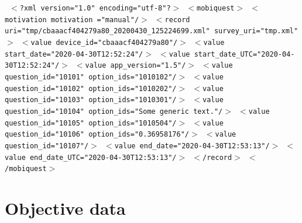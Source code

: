 \documentclass[11pt,a4paper,titlepage]{article}
\begin{document}
\begin{center}
	\begin{tcolorbox}[colback=black!10!white,colframe=black!50!white, boxsep=1pt,left=4pt,right=4pt,top=4pt,bottom=2pt]
		\texttt{\noindent
			$<$?xml version="1.0" encoding="utf-8"?$>$\newline
			$<$mobiquest$>$\newline
			$<$motivation motivation ="manual"/$>$\newline
			$<$record uri="tmp/cbaaacf404279a80\_20200430\_125224699.xml"\newline
			\hspace*{0.5cm}survey\_uri="tmp.xml"$>$\newline
			$<$value device\_id="cbaaacf404279a80"/$>$\newline
			$<$value start\_date="2020-04-30T12:52:24"/$>$\newline
			$<$value start\_date\_UTC="2020-04-30T12:52:24"/$>$\newline
			$<$value app\_version="1.5"/$>$\newline
			$<$value question\_id="10101" option\_ids="1010102"/$>$\newline
			$<$value question\_id="10102" option\_ids="1010202"/$>$\newline
			$<$value question\_id="10103" option\_ids="1010301"/$>$\newline
			$<$value question\_id="10104" option\_ids="Some generic text."/$>$\newline
			$<$value question\_id="10105" option\_ids="1010504"/$>$\newline
			$<$value question\_id="10106" option\_ids="0.36958176"/$>$\newline
			$<$value question\_id="10107"/$>$\newline
			$<$value end\_date="2020-04-30T12:53:13"/$>$\newline
			$<$value end\_date\_UTC="2020-04-30T12:53:13"/$>$\newline
			$<$/record$>$\newline
			$<$/mobiquest$>$
		}
	\end{tcolorbox}
\end{center}


\clearpage


\section{Objective data}
\end{document}
